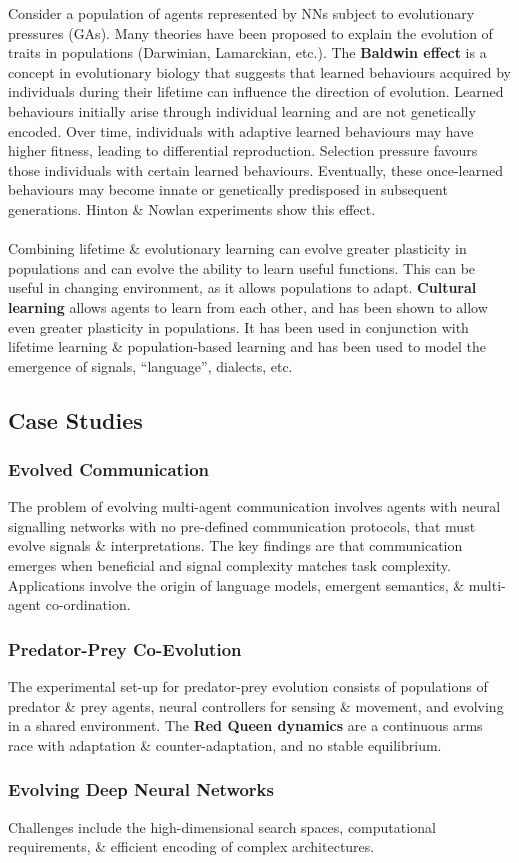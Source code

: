 \documentclass[a4paper,11pt]{article}
\begin{document}
Consider a population of agents represented by NNs subject to evolutionary pressures (GAs).
Many theories have been proposed to explain the evolution of traits in populations (Darwinian, Lamarckian, etc.).
The \textbf{Baldwin effect} is a concept in evolutionary biology that suggests that learned behaviours acquired by individuals during their lifetime can influence the direction of evolution.
Learned behaviours initially arise through individual learning and are not genetically encoded.
Over time, individuals with adaptive learned behaviours may have higher fitness, leading to differential reproduction.
Selection pressure favours those individuals with certain learned behaviours. 
Eventually, these once-learned behaviours may become innate or genetically predisposed in subsequent generations.
Hinton \& Nowlan experiments show this effect.
\\\\
Combining lifetime \& evolutionary learning can evolve greater plasticity in populations and can evolve the ability to learn useful functions.
This can be useful in changing environment, as it allows populations to adapt.
\textbf{Cultural learning} allows agents to learn from each other, and has been shown to allow even greater plasticity in populations.
It has been used in conjunction with lifetime learning \& population-based learning and has been used to model the emergence of signals, ``language'', dialects, etc.

\subsection{Case Studies}
\subsubsection{Evolved Communication}
The problem of evolving multi-agent communication involves agents with neural signalling networks with no pre-defined communication protocols, that must evolve signals \& interpretations.
The key findings are that communication emerges when beneficial and signal complexity matches task complexity.
Applications involve the origin of language models, emergent semantics, \& multi-agent co-ordination.

\subsubsection{Predator-Prey Co-Evolution}
The experimental set-up for predator-prey evolution consists of populations of predator \& prey agents, neural controllers for sensing \& movement, and evolving in a shared environment.
The \textbf{Red Queen dynamics} are a continuous arms race with adaptation \& counter-adaptation, and no stable equilibrium.

\subsubsection{Evolving Deep Neural Networks}
Challenges include the high-dimensional search spaces, computational requirements, \& efficient encoding of complex architectures.
\end{document}
